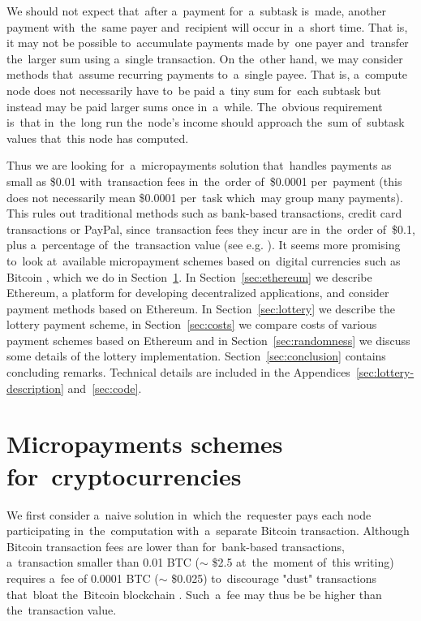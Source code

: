 \documentclass[a4paper]{article}
\newcommand{\BTC}{BTC}%
\begin{document}
    We should not expect that~after a~payment for~a~subtask  is~made, another payment with~the~same payer and~recipient
    will occur in~a~short time. That is, it may not be possible to~accumulate payments made by~one payer and~transfer
    the~larger sum using a~single transaction. On the~other hand, we may consider methods that~assume recurring
    payments to~a~single payee. That is, a~compute node does not necessarily have to~be paid a~tiny sum for~each
    subtask but instead may be paid larger sums once in~a~while. The~obvious requirement  is~that in~the~long run
    the~node's income should approach the~sum of~subtask values that~this node has computed.

    Thus we are looking for~a~micropayments solution that~handles payments as small as \$0.01 with~transaction fees
    in~the~order of~\$0.0001 per~payment (this does not necessarily mean \$0.0001 per~task which~may group many
    payments). This rules out traditional methods such as bank-based transactions, credit card transactions or PayPal,
    since~transaction fees they incur are in~the~order of~\$0.1, plus a~percentage of~the~transaction value
    (see e.g. \cite{FRS}).
    It seems more promising to~look at~available micropayment schemes based on~digital currencies such
    as Bitcoin \cite{BITCOIN}, which we do in Section~\ref{sec:cryptocurrencies}. In Section~\ref{sec:ethereum} we
    describe Ethereum, a platform for developing decentralized applications, and consider payment methods based
    on Ethereum. In Section~\ref{sec:lottery} we describe the lottery payment scheme, in Section~\ref{sec:costs} 
    we compare costs of various payment schemes based on Ethereum and in Section~\ref{sec:randomness} we discuss some
    details of the lottery implementation. Section~\ref{sec:conclusion} contains concluding remarks. Technical
    details are included in the Appendices~\ref{sec:lottery-description} and~\ref{sec:code}.

\section{Micropayments schemes for~cryptocurrencies}
\label{sec:cryptocurrencies}    

    We first consider a~naive solution in~which the~requester pays each node participating in~the~computation
    with~a~separate Bitcoin transaction. Although Bitcoin transaction fees are lower than for~bank-based transactions,
    a~transaction smaller than 0.01 \BTC{} ($\sim$ \$2.5 at~the~moment of~this writing) requires a~fee of
    0.0001 \BTC{} ($\sim$ \$0.025) to~discourage "dust" transactions that~bloat the~Bitcoin blockchain \cite{BITFEE}.
    Such~a~fee may thus be be higher than the~transaction value.
\end{document}
